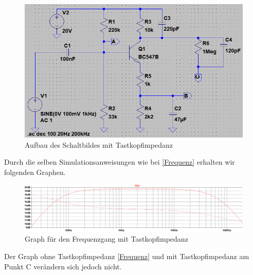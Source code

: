             \begin{figure}[h!]
                \label{fig:tast}
                \centering
                \includegraphics[width=0.7\linewidth]{326.PNG}
                \caption{Aufbau des Schaltbildes mit Tastkopfimpedanz}
            \end{figure}

            Durch die selben Simulationsanweisungen wie bei \ref{Frequenz} erhalten wir folgenden Graphen.

            \begin{figure}[h!]
                \centering
                \includegraphics[width=\linewidth]{3261.PNG}
                \caption{Graph für den Frequenzgang mit Tastkopfimpedanz}
            \end{figure}
            Der Graph ohne Tastkopfimpedanz \ref{Frequenz} und mit Tastkopfimpedanz am Punkt C verändern sich jedoch nicht.

